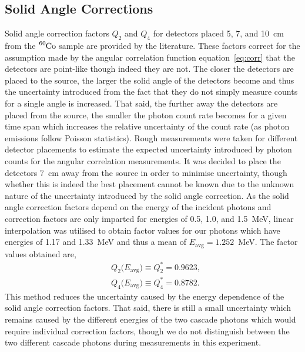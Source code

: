 \documentclass[twocolumn]{article}
\begin{document}
\subsection{Solid Angle Corrections}
Solid angle correction factors $Q_2$ and $Q_4$ for detectors placed 5, 7, and 10~cm from the $\ce{^{60}Co}$ sample are provided by the literature.\cite{sieg} These factors correct for the assumption made by the angular correlation function equation~\ref{eq:corr} that the detectors are point-like though indeed they are not. The closer the detectors are placed to the source, the larger the solid angle of the detectors become and thus the uncertainty introduced from the fact that they do not simply measure counts for a single angle is increased. That said, the further away the detectors are placed from the source, the smaller the photon count rate becomes for a given time span which increases the relative uncertainty of the count rate (as photon emissions follow Poisson statistics). Rough measurements were taken for different detector placements to estimate the expected uncertainty introduced by photon counts for the angular correlation measurements. It was decided to place the detectors 7~cm away from the source in order to minimise uncertainty, though whether this is indeed the best placement cannot be known due to the unknown nature of the uncertainty introduced by the solid angle correction. As the solid angle correction factors depend on the energy of the incident photons and correction factors are only imparted for energies of 0.5, 1.0, and 1.5~MeV, linear interpolation was utilised to obtain factor values for our photons which have energies of 1.17 and 1.33~MeV and thus a mean of $E_{\text{avg}} = 1.252$~MeV. The factor values obtained are,
\begin{align*}
&Q_2\big(E_{\text{avg}}\big) \equiv Q^*_2 = 0.9623,\\
&Q_4\big(E_{\text{avg}}\big) \equiv Q^*_4 = 0.8782.
\end{align*}
This method reduces the uncertainty caused by the energy dependence of the solid angle correction factors. That said, there is still a small uncertainty which remains caused by the different energies of the two cascade photons which would require individual correction factors, though we do not distinguish between the two different cascade photons during measurements in this experiment.
\end{document}
